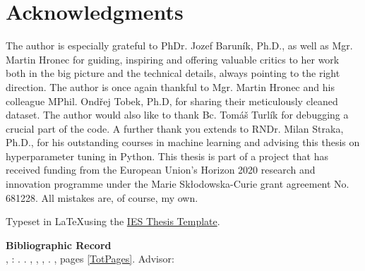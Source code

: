 \section*{Acknowledgments}
The author is especially grateful to PhDr. Jozef Barun\'{i}k, Ph.D., as well as Mgr. Martin Hronec for guiding, inspiring and offering valuable critics to her work both in the big picture and the technical details, always pointing to the right direction. The author is once again thankful to Mgr. Martin Hronec and his colleague MPhil. Ond\v{r}ej Tobek, Ph.D, for sharing their meticulously cleaned dataset. The author would also like to thank Bc. Tom\'{a}\v{s} Turl\'{i}k for debugging a crucial part of the code. A further thank you extends to RNDr. Milan Straka, Ph.D., for his outstanding courses in machine learning and advising this thesis on hyperparameter tuning in Python. This thesis is part of a project that has received funding from the European Union’s Horizon 2020 research and innovation programme under the Marie Skłodowska-Curie grant agreement No. 681228. All mistakes are, of course, my own. 


\vfill

\noindent Typeset in \LaTeX  using the \href{https://is.cuni.cz/studium/eng/predmety/index.php?do=predmet&kod=JEM001}{IES Thesis Template}. 

\bigskip

\noindent \textbf{Bibliographic Record} \\
\LastNameDP, \FirstNameDP: \emph{\Bookname}. \BookName. \CUNI, \FSS, \IES, \Place. \Year, pages \ref*{TotPages}. Advisor: \Supervisor



